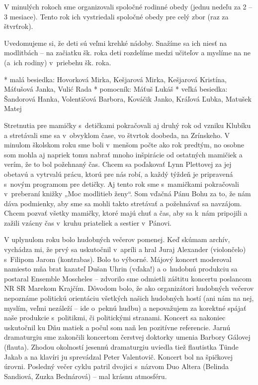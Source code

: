 V minulých rokoch sme organizovali spoločné rodinné obedy (jednu nedeľu za 2 – 3 mesiace). Tento rok ich vystriedali spoločné obedy pre celý zbor (raz za štvrťrok).


Uvedomujeme si, že deti sú veľmi krehké nádoby. Snažíme sa ich niesť na modlitbách – na začiatku šk. roka deti rozdelíme medzi učiteľov a myslíme na ne (a~ich rodiny) v~priebehu šk. roka.


\begitems
* malá besiedka: Hovorková Mirka, Kešjarová Mirka, Kešjarová Kristína, Máťušová Janka, Vulić Rada
* pomocník: Máťuš Lukáš
* veľká besiedka: Šandorová Hanka, Volentičová Barbora, Kováčik Janko, Kráľová Ľubka, Matušek Matej
\enditems
{}


Stretnutia pre mamičky s~detičkami pokračovali aj druhý rok od vzniku Klubíku a stretávali sme sa v~obvyklom čase, vo štvrtok doobeda, na Zrínskeho. V minulom školskom roku sme boli v~menšom počte ako rok predtým, no osobne som mohla aj napriek tomu nabrať mnoho inšpirácie od ostatných mamičiek a verím, že to bol požehnaný čas. Chcem sa poďakovať Lynn Plettovej za jej obetavú a vytrvalú prácu, ktorú pre nás robí, a každý týždeň je pripravená s~novým programom pre detičky. Aj tento rok sme s~mamičkami pokračovali v~preberaní knižky „Moc modlitieb ženy“. Som vďačná Pánu Bohu za to, že nám dáva podmienky, aby sme sa mohli takto stretávať a požehnávať sa navzájom. Chcem pozvať všetky mamičky, ktoré majú chuť a čas, aby sa k~nám pripojili a zažili vzácny čas v~kruhu priateliek a sestier v~Pánovi.



V uplynulom roku bolo hudobných večerov pomenej. Keď skúmam archív, vychádza mi, že prvý sa uskutočnil v~apríli a hral Juraj Alexander (violončelo) s~Filipom Jarom (kontrabas). Bolo to výborné. Májový koncert moderoval namiesto mňa brat kazateľ Dušan Uhrin (vďaka!) a o~hudobnú produkciu sa postaral Ensemble Moscheles – zdvorilo sme odmietli záštitu koncertu poslancom NR SR Marekom Krajčím. Dôvodom bolo, že ako organizátori hudobných večerov nepoznáme politickú orientáciu všetkých našich hudobných hostí (ani nám na nej, myslím, veľmi nezáleží – ide o~peknú hudbu) a nepovažujem za korektné spájať naše produkcie s~politikmi, či politickými stranami. Koncert sa nakoniec uskutočnil ku Dňu matiek a počul som naň len pozitívne referencie. Jarnú dramaturgiu sme zakončili koncertom čerstvej doktorky umenia Barbory Gálovej (flauta). Zhodou okolností jesennú dramaturgiu uviedla tiež flautistka Tünde Jakab a na klavíri ju sprevádzal Peter Valentovič. Koncert bol na špičkovej úrovni. Posledný večer cyklu patril dvojici s~názvom Duo Altera (Belinda Sandiová, Zuzka Bednárová) – mal krásnu atmosféru.

